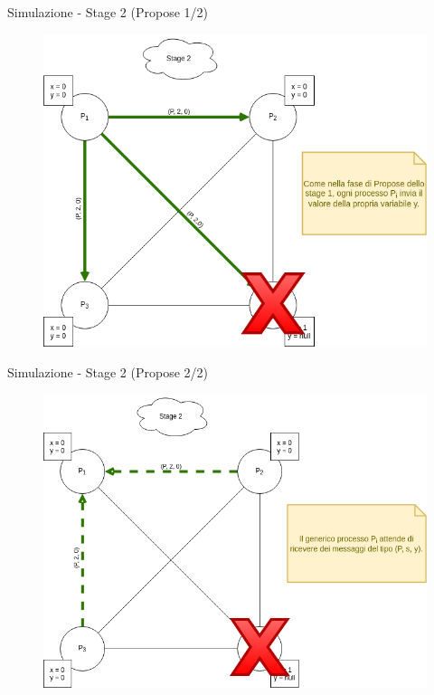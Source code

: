 \documentclass{beamer}
\begin{document}
\begin{frame}{Simulazione - Stage 2 (Propose 1/2)}
\begin{figure}
    \centering
    \includegraphics[scale=0.35]{simulazione/simulazione10.png}
\end{figure}
\end{frame}

\begin{frame}{Simulazione - Stage 2 (Propose 2/2)}
\begin{figure}
    \centering
    \includegraphics[scale=0.35]{simulazione/simulazione11.png}
\end{figure}
\end{frame}
\end{document}
